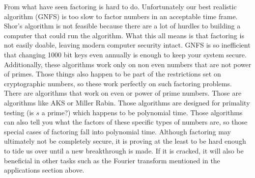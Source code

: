 From what have seen factoring is hard to do. Unfortunately our best realistic algorithm (GNFS) is too slow to factor numbers in an acceptable time frame. Shor's algorithm is not feasible because there are a lot of hurdles to building a computer that could run the algorithm. What this all means is that factoring is not easily doable, leaving modern computer security intact. GNFS is so inefficient that changing 1000 bit keys even annually is enough to keep your system secure. Additionally, these algorithms work only on non even numbers that are not power of primes. Those things also happen to be part of the restrictions set on cryptographic numbers, so these work perfectly on such factoring problems. There are algorithms that work on even or power of prime numbers. Those are algorithms like AKS or Miller Rabin. Those algorithms are designed for primality testing (is $s$ a prime?) which happens to be polynomial time. Those algorithms can also tell you what the factors of these specific types of numbers are, so those special cases of factoring fall into polynomial time. Although factoring may ultimately not be completely secure, it is proving at the least to be hard enough to tide us over until a new breakthrough is made. If it is cracked, it will also be beneficial in other tasks such as the Fourier transform mentioned in the applications section above.
